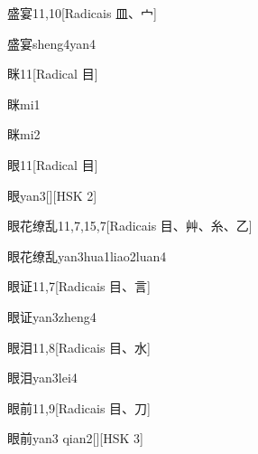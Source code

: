 \begin{entry}{盛宴}{11,10}[Radicais ⽫、⼧]
  \begin{phonetics}{盛宴}{sheng4yan4}
  \end{phonetics}
\end{entry}

\begin{entry}{眯}{11}[Radical ⽬]
  \begin{phonetics}{眯}{mi1}
  \end{phonetics}
  \begin{phonetics}{眯}{mi2}
  \end{phonetics}
\end{entry}

\begin{entry}{眼}{11}[Radical ⽬]
  \begin{phonetics}{眼}{yan3}[][HSK 2]
  \end{phonetics}
\end{entry}

\begin{entry}{眼花缭乱}{11,7,15,7}[Radicais ⽬、⾋、⽷、⼄]
  \begin{phonetics}{眼花缭乱}{yan3hua1liao2luan4}
  \end{phonetics}
\end{entry}

\begin{entry}{眼证}{11,7}[Radicais ⽬、⾔]
  \begin{phonetics}{眼证}{yan3zheng4}
  \end{phonetics}
\end{entry}

\begin{entry}{眼泪}{11,8}[Radicais ⽬、⽔]
  \begin{phonetics}{眼泪}{yan3lei4}
  \end{phonetics}
\end{entry}

\begin{entry}{眼前}{11,9}[Radicais ⽬、⼑]
  \begin{phonetics}{眼前}{yan3 qian2}[][HSK 3]
  \end{phonetics}
\end{entry}

